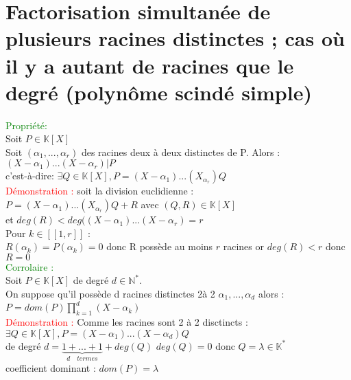 \documentclass{article}
\begin{document}
\section{Factorisation simultanée de plusieurs racines distinctes ; cas où il y a autant de racines que le degré (polynôme scindé simple)}
\textcolor{green}{Propriété:} \\
Soit $P \in \mathbb K [X]$ \\
Soit $(\alpha_1,...,\alpha_r)$ des racines deux à deux distinctes de P. Alors : \\
$(X-\alpha_1)...(X-\alpha_r)|P$ \\
c'est-à-dire: $\exists Q \in \mathbb K  [X], P=(X-\alpha_1)...(X_\alpha_r)Q$\\
\textcolor{red}{Démonstration :} soit la division euclidienne : \\
$P=(X-\alpha_1)...(X_\alpha_r)Q +R$  avec $(Q,R) \in \mathbb K [X]$ \\
et $deg(R)<deg((X-\alpha_1) ...(X- \alpha_r)=r$ \\
Pour $k \in [[1,r]]$ : \\
$R(\alpha_k)=P(\alpha_k)=0$ donc R possède au moins $r$ racines or $deg(R)<r$ donc $R=0$\\
\textcolor{green}{Corrolaire :} \\
Soit $P \in \mathbb K [X]$ de degré $d \in \mathbb N^*$. \\
On suppose qu'il possède d racines distinctes 2à 2 $\alpha_1,...,\alpha_d$ alors : \\
$P=dom(P) \prod_{k=1}^d (X-\alpha_k)$ \\
\textcolor{red}{Démonstration : } Comme les racines sont 2 à 2 disctincts : \\
$\exists Q \in \mathbb K [X], P=(X- \alpha_1)...(X- \alpha_d)Q$ \\
de degré $d=\underbrace{1+ ...+1}_{d \quad termes} + deg(Q)$ $deg(Q)=0$ donc $Q=\lambda \in \mathbb K^*$ \\
coefficient dominant : $dom(P)=\lambda$
\end{document}
